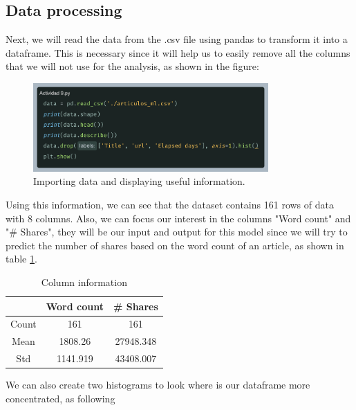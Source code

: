 \documentclass[10pt]{article}
\begin{document}
\subsection{Data processing}
Next, we will read the data from the .csv file using pandas to transform it into a dataframe. This is necessary since it will help us to easily remove all the columns that we will not use for the analysis, as shown in the figure: \par

\begin{figure}[h]
  \centering
  \includegraphics[width=90mm]{2025-03-26-14-19-30.png}
  \caption{Importing data and displaying useful information.}
\end{figure}

Using this information, we can see that the dataset contains 161 rows of data with 8 columns. Also, we can focus our interest in the columns "Word count" and "\# Shares", they will be our input and output for this model since we will try to predict the number of shares based on the word count of an article, as shown in table \ref{col_info}. \par

\begin{table}[!ht]
  \centering
  \caption{Column information}
  \label{col_info}
    \begin{tabular}{|c|c|c|}
      \hline
       & Word count & \# Shares \\
      \hline
      Count & 161 & 161 \\
      \hline
      Mean & 1808.26 & 27948.348 \\
      \hline
      Std & 1141.919 & 43408.007 \\
      \hline
    \end{tabular}
\end{table}

We can also create two histograms to look where is our dataframe more concentrated, as following \par
\end{document}
